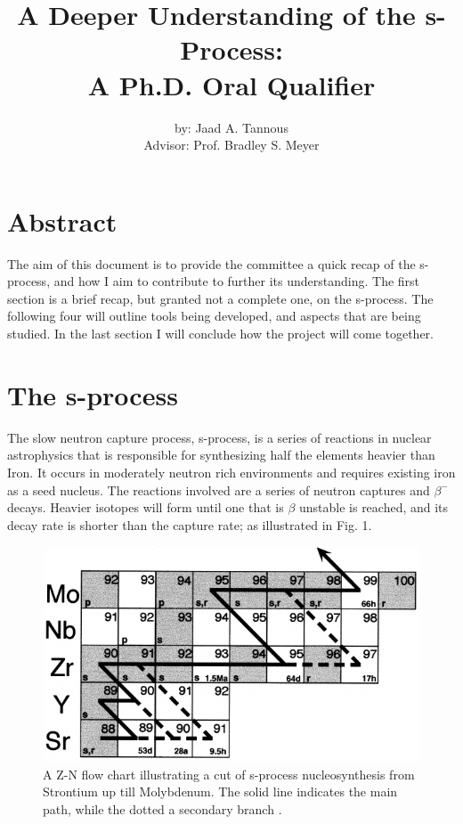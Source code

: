 \documentclass{article}
\title{A Deeper Understanding of the s-Process:\\
A Ph.D. Oral Qualifier}
\author{by: Jaad A. Tannous\\
Advisor: Prof. Bradley S. Meyer}
\date{}
\begin{document}
\maketitle

\section*{Abstract}
The aim of this document is to provide the committee a quick recap of the s-process, and how I aim to 
contribute to further its understanding. The first section is a brief recap, but granted not a complete 
one, on the s-process. The following four will outline tools being developed, and aspects that are being 
studied. In the last section I will conclude how the project will come together.

\section*{The s-process}
The slow neutron capture process, s-process, is a series of reactions in nuclear astrophysics that is responsible 
for synthesizing half the elements heavier than Iron. It occurs in moderately neutron rich environments and requires 
existing iron as a seed nucleus. The reactions involved are a series of neutron captures and $\beta^{-}$ decays. Heavier 
isotopes will form until one that is $\beta$ unstable is reached, and its decay rate is shorter than the capture rate; as illustrated 
in Fig. 1.

\begin{figure}[!htp]
    \centerline{\includegraphics[scale = 0.5]{images/sprocess.png}}
    \caption{A Z-N flow chart illustrating a cut of s-process nucleosynthesis from Strontium up till 
    Molybdenum. The solid line indicates the main path, while the dotted a secondary branch \cite{nic98}.}
\end{figure}
\end{document}
